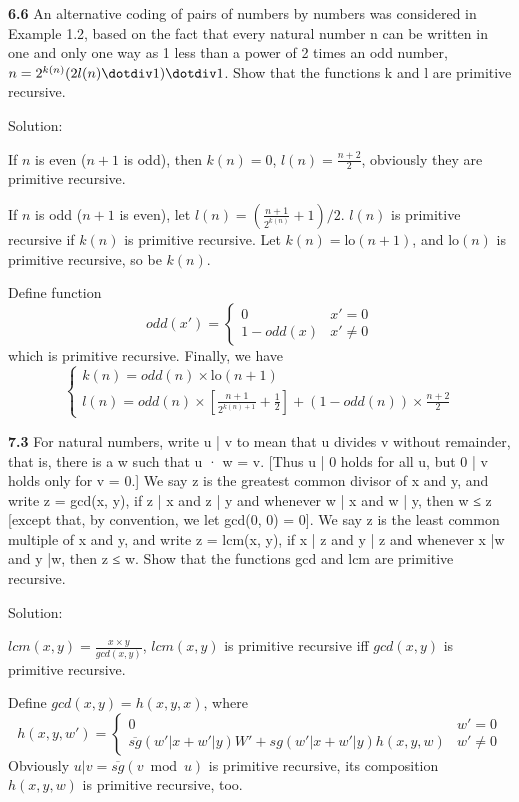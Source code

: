 \documentclass{ctexart}
\begin{document}
\textbf{6.6} An alternative coding of pairs of numbers by numbers was considered in
Example 1.2, based on the fact that every natural number n can be written
in one and only one way as 1 less than a power of 2 times an odd number,
$n = 2^{k(n)} (2l(n) \dotdiv 1) \dotdiv 1$. Show that the functions k and l are primitive recursive.

Solution:

If $n$ is even ($n + 1$ is odd), then $k(n) = 0$, $l(n) = \frac{n + 2}{2}$, obviously they are primitive recursive.

If $n$ is odd ($n+1$ is even), let $l(n) = (\frac{n + 1}{2^{k(n)}} + 1) / 2$. $l(n)$ is primitive recursive if $k(n)$
is primitive recursive. Let $k(n) = \mathrm{lo}(n + 1)$, and $\mathrm{lo}(n)$ is primitive recursive, so be $k(n)$.

Define function
$$
odd(x') = \begin{cases}
0 & x' = 0 \\
1 - odd(x) & x' \not= 0
\end{cases}
$$
which is primitive recursive. Finally, we have
$$
\begin{cases}
k(n) = odd(n) \times \mathrm{lo}(n + 1) \\
l(n) = odd(n) \times [\frac{n + 1}{2^{k(n)+1}} + \frac 1 2] + (1 - odd(n)) \times \frac{n + 2}{2}
\end{cases}
$$

\textbf{7.3} For natural numbers, write u | v to mean that u divides v without remainder,
that is, there is a w such that u · w = v. [Thus u | 0 holds for all u, but 0 | v
holds only for v = 0.] We say z is the greatest common divisor of x and y, and
write z = gcd(x, y), if z | x and z | y and whenever w | x and w | y, then w ≤ z
[except that, by convention, we let gcd(0, 0) = 0]. We say z is the least common
multiple of x and y, and write z = lcm(x, y), if x | z and y | z and whenever
x |w and y |w, then z ≤ w. Show that the functions gcd and lcm are primitive
recursive.

Solution:

$lcm(x, y) = \frac{x \times y}{gcd(x, y)}$, $lcm(x, y)$ is primitive recursive iff
$gcd(x, y)$ is primitive recursive.

Define $gcd(x, y) = h(x, y, x)$, where
$$
h(x, y, w') = \begin{cases}
0 & w' = 0 \\
\overline{sg}(w' | x + w' | y) W' + sg(w' | x + w' | y) h(x, y, w) & w' \not= 0
\end{cases}
$$
Obviously $u | v = \overline{sg}(v \bmod u)$ is primitive recursive,
its composition $h(x, y, w)$ is primitive recursive, too.
\end{document}
